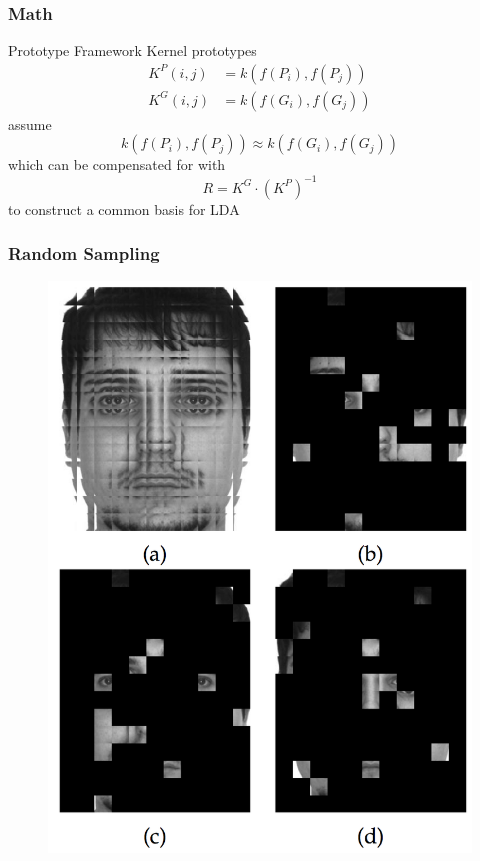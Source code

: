 \documentclass{beamer}
\begin{document}
\begin{frame}
\frametitle{Math}
\begin{block}{Prototype Framework}
Kernel prototypes
\begin{equation}
\begin{split}
K^P(i,j) &= k(f(P_i), f(P_j)) \\
K^G(i,j) &= k(f(G_i), f(G_j))
\end{split}
\end{equation}
assume
\begin{equation}
k(f(P_i), f(P_j)) \approx k(f(G_i), f(G_j))
\end{equation}
which can be compensated for with
\begin{equation}
R = K^G \cdot (K^P)^{-1}
\end{equation}
to construct a common basis for LDA
\end{block}
\end{frame}

\begin{frame}
\frametitle{Random Sampling}
\begin{figure}
\includegraphics[height=.85\textheight]{randomsampling}
\end{figure}
\end{frame}
\end{document}
